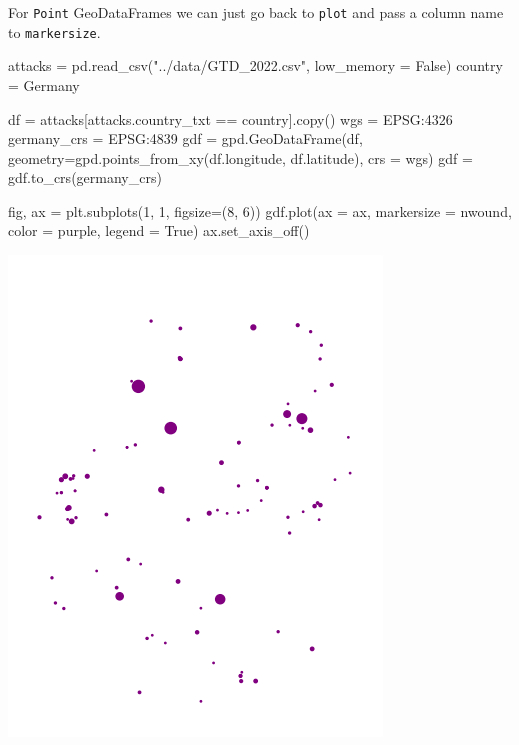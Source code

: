 \documentclass[
  letterpaper,
  DIV=11,
  numbers=noendperiod]{scrreprt}
\newenvironment{Shaded}{\begin{snugshade}}{\end{snugshade}}
\newcommand{\DecValTok}[1]{\textcolor[rgb]{0.68,0.00,0.00}{#1}}
\newcommand{\NormalTok}[1]{\textcolor[rgb]{0.00,0.23,0.31}{#1}}
\newcommand{\OperatorTok}[1]{\textcolor[rgb]{0.37,0.37,0.37}{#1}}
\newcommand{\StringTok}[1]{\textcolor[rgb]{0.13,0.47,0.30}{#1}}
\newcommand{\VariableTok}[1]{\textcolor[rgb]{0.07,0.07,0.07}{#1}}
\begin{document}
For \texttt{Point} GeoDataFrames we can just go back to \texttt{plot}
and pass a column name to \texttt{markersize}.

\begin{Shaded}
\begin{Highlighting}[]
\NormalTok{attacks }\OperatorTok{=}\NormalTok{ pd.read\_csv(}\StringTok{"../data/GTD\_2022.csv"}\NormalTok{, low\_memory }\OperatorTok{=} \VariableTok{False}\NormalTok{)}
\NormalTok{country }\OperatorTok{=} \StringTok{\textquotesingle{}Germany\textquotesingle{}}

\NormalTok{df }\OperatorTok{=}\NormalTok{ attacks[attacks.country\_txt }\OperatorTok{==}\NormalTok{ country].copy()}
\NormalTok{wgs }\OperatorTok{=} \StringTok{\textquotesingle{}EPSG:4326\textquotesingle{}}
\NormalTok{germany\_crs }\OperatorTok{=} \StringTok{\textquotesingle{}EPSG:4839\textquotesingle{}}
\NormalTok{gdf }\OperatorTok{=}\NormalTok{ gpd.GeoDataFrame(df, geometry}\OperatorTok{=}\NormalTok{gpd.points\_from\_xy(df.longitude, df.latitude), crs }\OperatorTok{=}\NormalTok{ wgs)}
\NormalTok{gdf }\OperatorTok{=}\NormalTok{ gdf.to\_crs(germany\_crs)}
\end{Highlighting}
\end{Shaded}

\begin{Shaded}
\begin{Highlighting}[]
\NormalTok{fig, ax }\OperatorTok{=}\NormalTok{ plt.subplots(}\DecValTok{1}\NormalTok{, }\DecValTok{1}\NormalTok{, figsize}\OperatorTok{=}\NormalTok{(}\DecValTok{8}\NormalTok{, }\DecValTok{6}\NormalTok{))}
\NormalTok{gdf.plot(ax }\OperatorTok{=}\NormalTok{ ax, markersize }\OperatorTok{=} \StringTok{\textquotesingle{}nwound\textquotesingle{}}\NormalTok{, color }\OperatorTok{=} \StringTok{\textquotesingle{}purple\textquotesingle{}}\NormalTok{, legend }\OperatorTok{=} \VariableTok{True}\NormalTok{)}
\NormalTok{ax.set\_axis\_off()}
\end{Highlighting}
\end{Shaded}

\includegraphics{labs/w02_maps_files/figure-pdf/cell-51-output-1.png}
\end{document}
